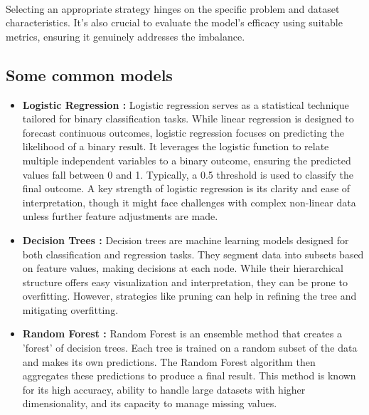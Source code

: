         \paragraph{}Selecting an appropriate strategy hinges on the specific problem and dataset characteristics. It's also crucial to evaluate the model's efficacy using suitable metrics, ensuring it genuinely addresses the imbalance.

    \subsection{Some common models}
    \begin{itemize}
        \item \textbf{Logistic Regression\cite{nick_logistic_2007} : }Logistic regression serves as a statistical technique tailored for binary classification tasks. While linear regression is designed to forecast continuous outcomes, logistic regression focuses on predicting the likelihood of a binary result. It leverages the logistic function to relate multiple independent variables to a binary outcome, ensuring the predicted values fall between 0 and 1. Typically, a 0.5 threshold is used to classify the final outcome. A key strength of logistic regression is its clarity and ease of interpretation, though it might face challenges with complex non-linear data unless further feature adjustments are made.
        
        \item \textbf{Decision Trees\cite{kotsiantis_decision_2013} : }Decision trees are machine learning models designed for both classification and regression tasks. They segment data into subsets based on feature values, making decisions at each node. While their hierarchical structure offers easy visualization and interpretation, they can be prone to overfitting. However, strategies like pruning can help in refining the tree and mitigating overfitting.
        
        \item \textbf{Random Forest\cite{probst_hyperparameters_2019} : }Random Forest is an ensemble method that creates a 'forest' of decision trees. Each tree is trained on a random subset of the data and makes its own predictions. The Random Forest algorithm then aggregates these predictions to produce a final result. This method is known for its high accuracy, ability to handle large datasets with higher dimensionality, and its capacity to manage missing values.
        

\end{itemize}
